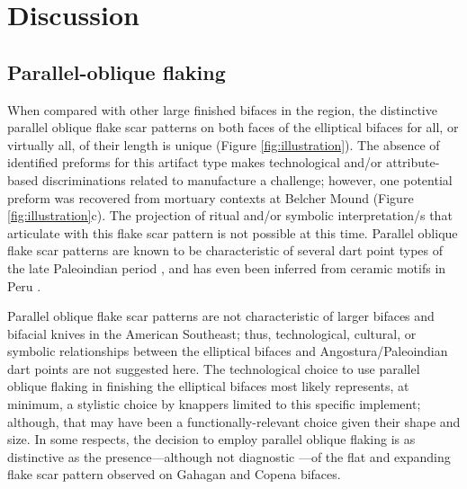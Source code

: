 \documentclass[]{interact}
\theoremstyle{plain}%
\theoremstyle{definition}
\theoremstyle{remark}
\begin{document}
\hypertarget{discussion}{%
\section{Discussion}\label{discussion}}

\hypertarget{parallel-oblique-flaking}{%
\subsection{Parallel-oblique flaking}\label{parallel-oblique-flaking}}

When compared with other large finished bifaces in the region, the
distinctive parallel oblique flake scar patterns on both faces of the
elliptical bifaces for all, or virtually all, of their length is unique
(Figure \ref{fig:illustration}). The absence of identified preforms for
this artifact type makes technological and/or attribute-based
discriminations related to manufacture a challenge; however, one
potential preform was recovered from mortuary contexts at Belcher Mound
(Figure \ref{fig:illustration}c). The projection of ritual and/or
symbolic interpretation/s that articulate with this flake scar pattern
is not possible at this time. Parallel oblique flake scar patterns are
known to be characteristic of several dart point types of the late
Paleoindian period
\citep{RN8584,RN7935,RN11182, RN9843,RN8143,RN10117,RN11181}, and has
even been inferred from ceramic motifs in Peru \citep{RN7938}.

Parallel oblique flake scar patterns are not characteristic of larger
bifaces and bifacial knives in the American Southeast; thus,
technological, cultural, or symbolic relationships between the
elliptical bifaces and Angostura/Paleoindian dart points are not
suggested here. The technological choice to use parallel oblique flaking
in finishing the elliptical bifaces most likely represents, at minimum,
a stylistic choice by knappers limited to this specific implement;
although, that may have been a functionally-relevant choice given their
shape and size. In some respects, the decision to employ parallel
oblique flaking is as distinctive as the presence---although not
diagnostic \citep{RN6170}---of the flat and expanding flake scar pattern
observed on Gahagan and Copena bifaces.
\end{document}
